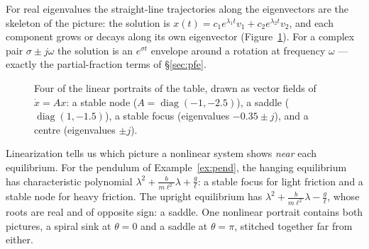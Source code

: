 \documentclass[11pt]{article}
\begin{document}
\noindent For real eigenvalues the straight-line trajectories along the
eigenvectors are the skeleton of the picture: the solution is
$x(t)=c_1e^{\lambda_1t}v_1+c_2e^{\lambda_2t}v_2$, and each component grows or
decays along its own eigenvector (Figure~\ref{fig:portraits}). For a complex pair
$\sigma\pm j\omega$ the solution is an $e^{\sigma t}$ envelope around a rotation at
frequency $\omega$ --- exactly the partial-fraction terms of \S\ref{sec:pfe}.

\begin{figure}[htb]
\centering
{}
\caption{Four of the linear portraits of the table, drawn as vector fields of
$\dot x=Ax$: a stable node ($A=\operatorname{diag}(-1,-2.5)$), a saddle
($\operatorname{diag}(1,-1.5)$), a stable focus (eigenvalues $-0.35\pm j$), and a
centre (eigenvalues $\pm j$).}
\label{fig:portraits}
\end{figure}

\begin{remark}
Linearization tells us which picture a nonlinear system shows \emph{near} each
equilibrium. For the pendulum of Example~\ref{ex:pend}, the hanging equilibrium
has characteristic polynomial $\lambda^{2}+\frac{b}{m\ell^{2}}\lambda+\frac g\ell$:
a stable focus for light friction and a stable node for heavy friction. The upright
equilibrium has $\lambda^{2}+\frac{b}{m\ell^{2}}\lambda-\frac g\ell$, whose roots
are real and of opposite sign: a saddle. One nonlinear portrait contains both
pictures, a spiral sink at $\theta=0$ and a saddle at $\theta=\pi$, stitched
together far from either.
\end{remark}
\end{document}
